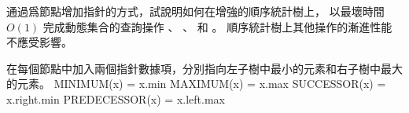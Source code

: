 通過爲節點增加指針的方式，試說明如何在增強的順序統計樹上，
以最壞時間 $O(1)$ 完成動態集合的查詢操作
 、 、  和 。
順序統計樹上其他操作的漸進性能不應受影響。
\stopEXERCISE

\startANSWER
在每個節點中加入兩個指針數據項，分別指向左子樹中最小的元素和右子樹中最大的元素。
\startformula\startmathalignment
\NC MINIMUM(x) \NC = x.min\NR
\NC MAXIMUM(x) \NC = x.max\NR
\NC SUCCESSOR(x) \NC = x.right.min\NR
\NC PREDECESSOR(x) \NC = x.left.max\NR
\stopmathalignment\stopformula
\stopANSWER
